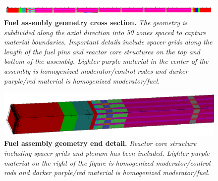 \begin{figure}[t!]
  \begin{center}
    \includegraphics[width=6.0in]{chapters/spn_equations/problem3_axial_mat.png}
  \end{center}
  \caption{\textbf{Fuel assembly geometry cross section.} \textit{The
      geometry is subdivided along the axial direction into 50 zones
      spaced to capture material boundaries. Important details include
      spacer grids along the length of the fuel pins and reactor core
      structures on the top and bottom of the assembly. Lighter purple
      material in the center of the assembly is homogenized
      moderator/control rodes and darker purple/red material is
      homogenized moderator/fuel.}}
  \label{fig:problem3_axial_mat}
\end{figure}
\begin{figure}[t!]
  \begin{center}
    \includegraphics[width=6.0in]{chapters/spn_equations/problem3_end.png}
  \end{center}
  \caption{\textbf{Fuel assembly geometry end detail.}
    \textit{Reactor core structure including spacer grids and plenum
      has been included. Lighter purple material on the right of the
      figure is homogenized moderator/control rods and darker
      purple/red material is homogenized moderator/fuel.}}
  \label{fig:problem3_end}
\end{figure}

